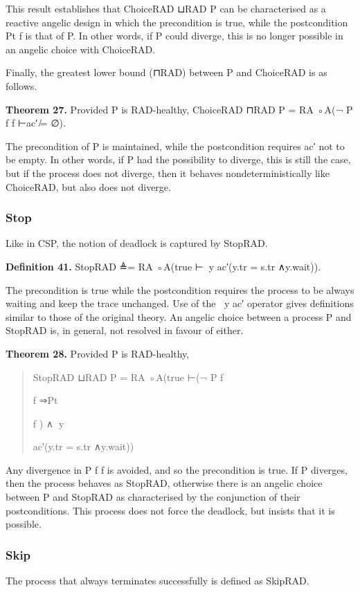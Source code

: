 \documentclass[11pt]{article}
\begin{document}
This result establishes that ChoiceRAD ⊔RAD P can be characterised as a reactive angelic design in which the precondition is true, while the postcondition Pt f is that of P. In other words, if P could diverge, this is no longer possible in an angelic choice with ChoiceRAD.

Finally, the greatest lower bound (⊓RAD) between P and ChoiceRAD is as follows.

\noindent\textbf{Theorem 27.} Provided P is RAD-healthy, ChoiceRAD ⊓RAD P = RA ◦A(¬ P f f ⊢ac′ ̸= ∅).


The precondition of P is maintained, while the postcondition requires ac′ not to be empty. In other words, if P had the possibility to diverge, this is still the case, but if the process does not diverge, then it behaves nondeterministically like ChoiceRAD, but also does not diverge.

\subsubsection{Stop}
Like in CSP, the notion of deadlock is captured by StopRAD.

\noindent\textbf{Definition 41.} StopRAD ≜= RA ◦A(true ⊢∈⃝y ac′(y.tr = s.tr ∧y.wait)).


The precondition is true while the postcondition requires the process to be always waiting and keep the trace unchanged. Use of the ∈⃝y ac′ operator gives definitions similar to those of the original theory. An angelic choice between a process P and StopRAD is, in general, not resolved in favour of either.

\noindent\textbf{Theorem 28.} Provided P is RAD-healthy,


\begin{quote}\small\raggedright
StopRAD ⊔RAD P = RA ◦A(true ⊢(¬ P f
\par
f ⇒Pt
\par
f ) ∧∈⃝y
\par
ac′(y.tr = s.tr ∧y.wait))
\end{quote}

Any divergence in P f f is avoided, and so the precondition is true. If P diverges, then the process behaves as StopRAD, otherwise there is an angelic choice between P and StopRAD as characterised by the conjunction of their postconditions. This process does not force the deadlock, but insists that it is possible.

\subsubsection{Skip}
The process that always terminates successfully is defined as SkipRAD.
\end{document}
